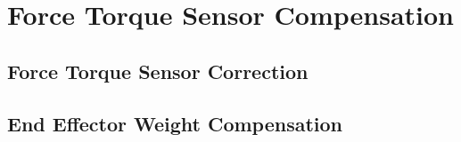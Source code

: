 \chapter{Force Torque Sensor Compensation}

\section{Force Torque Sensor Correction}

\section{End Effector Weight Compensation}

